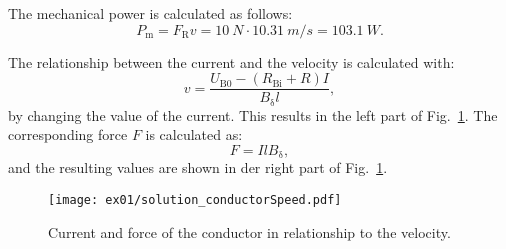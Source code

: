 \begin{solutionblock}

    The mechanical power is calculated as follows:
    \begin{equation}
        P_{\mathrm{m}} = F_{\mathrm{R}} v
        = 10 \ \si{N} \cdot 10.31 \ \si{m/s}
        = 103.1 \ \si{W}.
    \end{equation}

    The relationship between the current and the velocity is calculated with:
    \begin{equation}
        v = \frac{U_{\mathrm{B0}}-(R_{\mathrm{Bi}}+R)I}{B_{\updelta} l},
    \end{equation}
    by changing the value of the current. This results in the left part of Fig.~\ref{fig:solution_conductorSpeed}.
    The corresponding force $F$ is calculated as:
    \begin{equation}
        F = I l B_{\updelta},
    \end{equation}
    and the resulting values are shown in der right part of Fig.~\ref{fig:solution_conductorSpeed}.
    \begin{figure}[ht]
        \centering
        \texttt{[image: ex01/solution\_conductorSpeed.pdf]}
        \caption{Current and force of the conductor in relationship to the velocity.}
        \label{fig:solution_conductorSpeed}
    \end{figure}

\end{solutionblock}




